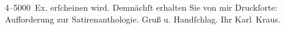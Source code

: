                     4–5000 Ex. erſcheinen wird. Demnächſt erhalten Sie von mir Druckſorte:
                    Aufforderung zur Satirenanthologie.\pend
           \pstart Gruß u. Handſchlag. Ihr \spacefill\mbox{Karl Kraus.}\pend{}\endnumbering{}  
      